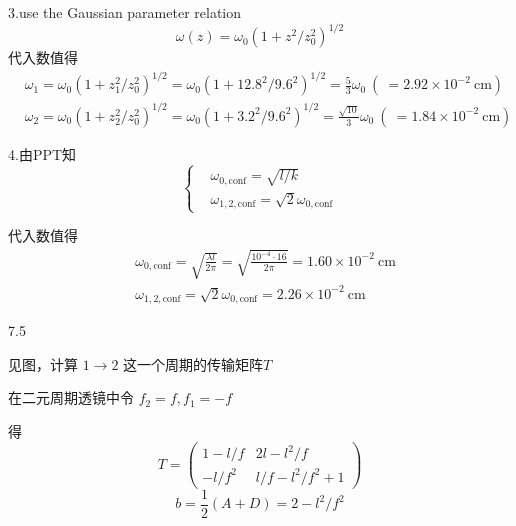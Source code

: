 
3.use the Gaussian parameter relation
$$
\omega(z)=\omega_0 \left(1+z^2/z_0^2\right)^{1/2}
$$
代入数值得
\begin{align*}
   &\omega_1=\omega_0 \left(1+z_1^2/z_0^2\right)^{1/2}
   =\omega_0(1+12.8^2/9.6^2)^{1/2}=\frac{5}{3}\omega_0
   \ (\ =2.92\times10^{-2} \ \mathrm{cm})\\
   &\omega_2=\omega_0 \left(1+z_2^2/z_0^2\right)^{1/2}
   =\omega_0(1+3.2^2/9.6^2)^{1/2}=\frac{\sqrt{10}}{3}\omega_0
   \ (\ =1.84\times10^{-2} \ \mathrm{cm})
\end{align*}

4.由PPT知
$$
\left\{
\begin{aligned}
    &\omega_{0,\mathrm{conf}}=\sqrt{l/k}\\
    &\omega_{1,2,\mathrm{conf}}=\sqrt{2}\omega_{0,\mathrm{conf}}
\end{aligned}
\right.
$$

代入数值得
\begin{align*}
    &\omega_{0,\mathrm{conf}}=\sqrt{\frac{\lambda l}{2\pi}}=\sqrt{\frac{10^{-4}\cdot 16}{2\pi}}
    =1.60\times10^{-2} \ \mathrm{cm}\\
    &\omega_{1,2,\mathrm{conf}}=\sqrt{2}\omega_{0,\mathrm{conf}}
    =2.26\times10^{-2} \ \mathrm{cm}
\end{align*}






7.5

见图，计算 $1\to2$ 这一个周期的传输矩阵$T$

在二元周期透镜中令 $f_2=f, f_1=-f$

得
$$
T=
\begin{pmatrix}1-l/f&2l-l^2/f\\-l/f^2&l/f-l^2/f^2+1\end{pmatrix}
$$
$$
b=\frac{1}{2}(A+D)=2-l^2/f^2
$$


